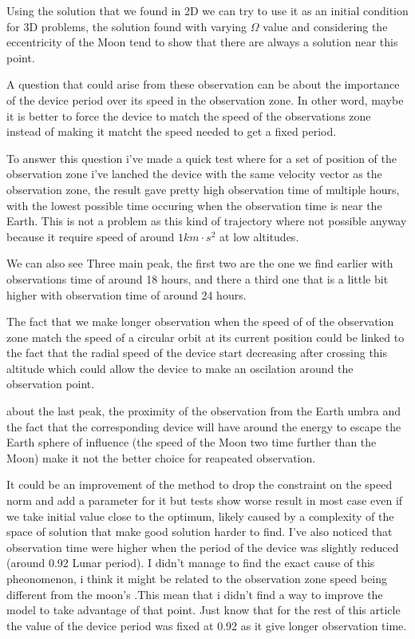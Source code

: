 \documentclass{article} %
\begin{document}
		Using the solution that we found in 2D we can try to use it as an initial condition for 3D problems, the solution found with varying $\Omega$ value and considering the eccentricity of the Moon tend to show that there are always a solution near this point.
		
		A question that could arise from these observation can be about the importance of the device period over its speed in the observation zone. In other word, maybe it is better to force the device to match the speed of the observations zone instead of making it matcht the speed needed to get a fixed period.
		
		To answer this question i've made a quick test where for a set of position of the observation zone i've lanched the device with the same velocity vector as the observation zone, the result gave pretty high observation time of multiple hours, with the lowest possible time occuring when the observation time is near the Earth. This is not a problem as this kind of trajectory where not possible anyway because it require speed of around $1 km\cdot s^2$ at low altitudes.
		
		We can also see Three main peak, the first two are the one we find earlier with observations time of around 18 hours, and there a third one that is a little bit higher with observation time of around 24 hours.
		
		The fact that we make longer observation when the speed of of the observation zone match the speed of a circular orbit at its current position could be linked to the fact that the radial speed of the device start decreasing after crossing this altitude which could allow the device to make an oscilation around the observation point.
		
		about the last peak, the proximity of the observation from the Earth umbra and the fact that the corresponding device will have around the energy to escape the Earth sphere of influence (the speed of the Moon two time further than the Moon) make it not the better choice for reapeated observation.
		
		It could be an improvement of the method to drop the constraint on the speed norm and add a parameter for it but tests show worse result in most case even if we take initial value close to the optimum, likely caused by a complexity of the space of solution that make good solution harder to find. I've also noticed that observation time were higher when the period of the device was slightly reduced (around 0.92 Lunar period). I didn't manage to find the exact cause of this pheonomenon, i think it might be related to the observation zone speed being different from the moon's .This mean that i didn't find a way to improve the model to take advantage of that point. Just know that for the rest of this article the value of the device period was fixed at 0.92 as it give longer observation time.
		
\end{document}
